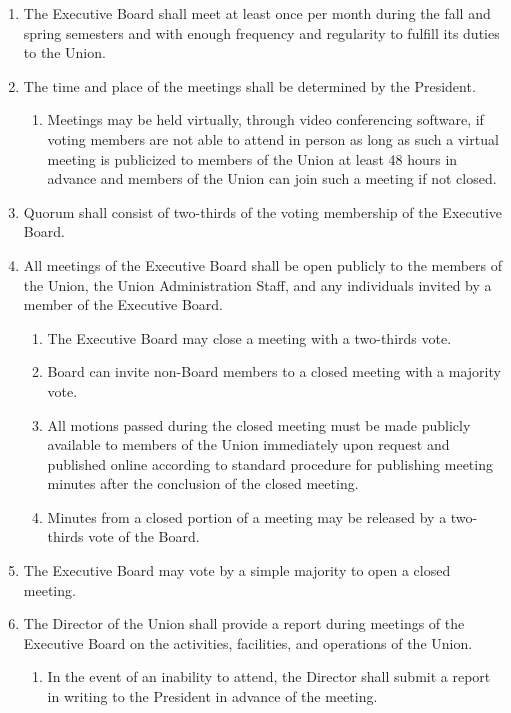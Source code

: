 
\begin{enumerate}
\item The Executive Board shall meet at least once per month during the fall and spring semesters and with enough frequency and regularity to fulfill its duties to the Union.
\item The time and place of the meetings shall be determined by the President.
  \begin{enumerate}
  \item Meetings may be held virtually, through video conferencing software, if voting members are not able to attend in person as long as such a virtual meeting is publicized to members of the Union at least 48 hours in advance and members of the Union can join such a meeting if not closed.
  \end{enumerate}
\item Quorum shall consist of two-thirds of the voting membership of the Executive Board.
\item All meetings of the Executive Board shall be open publicly to the members of the Union, the Union Administration Staff, and any individuals invited by a member of the Executive Board.
  \begin{enumerate}
  \item The Executive Board may close a meeting with a two-thirds vote.
  \item Board can invite non-Board members to a closed meeting with a majority vote.
  \item All motions passed during the closed meeting must be made publicly available to members of the Union immediately upon request and published online according to standard procedure for publishing meeting minutes after the conclusion of the closed meeting.
  \item Minutes from a closed portion of a meeting may be released by a two-thirds vote of the Board.
  \end{enumerate}
\item The Executive Board may vote by a simple majority to open a closed meeting.
\item The Director of the Union shall provide a report during meetings of the Executive Board on the activities, facilities, and operations of the Union.
  \begin{enumerate}
  \item In the event of an inability to attend, the Director shall submit a report in writing to the President in advance of the meeting.

\end{enumerate}
\end{enumerate}

